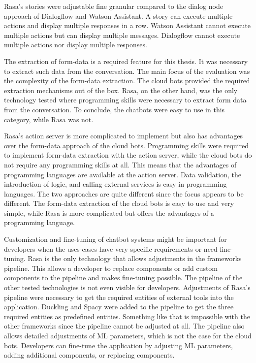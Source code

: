 Rasa's stories were adjustable fine granular compared to the dialog node approach of Dialogflow and Watson Assistant.
A story can execute multiple actions and display multiple responses in a row.
Watson Assistant cannot execute multiple actions but can display multiple messages.
Dialogflow cannot execute multiple actions nor display multiple responses. 

The extraction of form-data is a required feature for this thesis.
It was necessary to extract such data from the conversation.
The main focus of the evaluation was the complexity of the form-data extraction.
The cloud bots provided the required extraction mechanisms out of the box. 
Rasa, on the other hand, was the only technology tested where programming skills were necessary to extract form data from the conversation. 
To conclude, the chatbots were easy to use in this category, while Rasa was not.

Rasa's action server is more complicated to implement but also has advantages over the form-data approach of the cloud bots.
Programming skills were required to implement form-data extraction with the action server, while the cloud bots do not require any programming skills at all.
This means that the advantages of programming languages are available at the action server.
Data validation, the introduction of logic, and calling external services is easy in programming languages. 
The two approaches are quite different since the focus appears to be different.
The form-data extraction of the cloud bots is easy to use and very simple, while Rasa is more complicated but offers the advantages of a programming language. 

Customization and fine-tuning of chatbot systems might be important for developers when the uses-cases have very specific requirements or need fine-tuning.
Rasa is the only technology that allows adjustments in the frameworks pipeline.
This allows a developer to replace components or add custom components to the pipeline and makes fine-tuning possible.
The pipeline of the other tested technologies is not even visible for developers.
Adjustments of Rasa's pipeline were necessary to get the required entities of external tools into the application.
Duckling and Spacy were added to the pipeline to get the three required entities as predefined entities.
Something like that is impossible with the other frameworks since the pipeline cannot be adjusted at all.
The pipeline also allows detailed adjustments of ML parameters, which is not the case for the cloud bots.
Developers can fine-tune the application by adjusting ML parameters, adding additional components, or replacing components.

